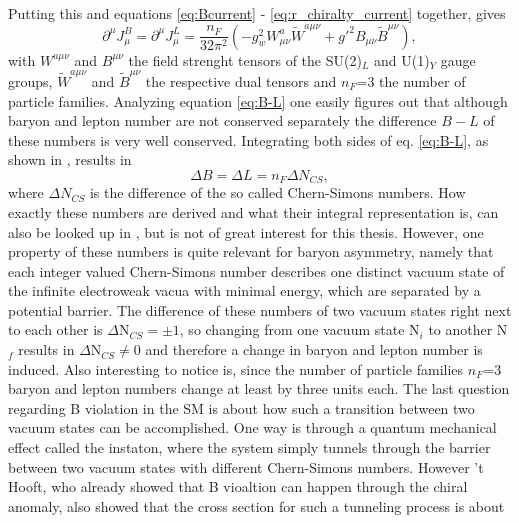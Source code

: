 Putting this and equations \eqref{eq:Bcurrent} - \eqref{eq:r_chiralty_current} together, gives
\begin{equation}
\partial^\mu J_\mu^B=\partial^\mu J_\mu^L=\frac{n_F}{32\pi^2}\left(-g_w^2W^a_{\mu\nu}\tilde{W}^{a\mu\nu}+g'^2B_{\mu\nu}\tilde{B}^{\mu\nu}\right),
\label{eq:B-L}
\end{equation}
with $W^{a\mu\nu}$ and $B^{\mu\nu}$ the field strenght tensors of the SU(2)$_L$ and U(1)$_Y$ gauge groups, $\tilde{W}^{a\mu\nu}$ and $\tilde{B}^{\mu\nu}$ the respective dual tensors and $n_F$=3 the number of particle families. \newline\indent
Analyzing equation \eqref{eq:B-L} one easily figures out that although baryon and lepton number are not conserved separately the difference $B-L$ of these numbers is very well conserved.
Integrating both sides of eq. \eqref{eq:B-L}, as shown in \cite[pp. 15f.]{Bernreuther:2002uj}, results in 
\begin{equation}
	\Delta B=\Delta L=n_F\Delta N_{CS},
	\label{eq:number_change}
\end{equation}
where $\Delta N_{CS}$ is the difference of the so called Chern-Simons numbers. How exactly these numbers are derived and what their integral representation is, can also be looked up in \cite{Cline:2006ts,Petropoulos:2003pm,Bernreuther:2002uj}, but is not of great interest for this thesis. However, one property of these numbers is quite relevant for baryon asymmetry, namely that each integer valued Chern-Simons number describes one distinct vacuum state of the infinite electroweak vacua with minimal energy, which are separated by a potential barrier. The difference of these numbers of two vacuum states right next to each other is $\Delta$N$_{CS}=\pm1$, so changing from one vacuum state N$_i$ to another N$_f$ results in $\Delta$N$_{CS}\neq0$ and therefore a change in baryon and lepton number is induced. Also interesting to notice is, since the number of particle families $n_F$=3 baryon and lepton numbers change at least by three units each. \newline\indent
The last question regarding B violation in the SM is about how such a transition between two vacuum states can be accomplished. One way is through a quantum mechanical effect called the instaton, where the system simply tunnels through the barrier between two vacuum states with different Chern-Simons numbers. However 't Hooft, who already showed that B vioaltion can happen through the chiral anomaly, also showed  \cite[p. 18]{Bernreuther:2002uj} that the cross section for such a tunneling process is about 
